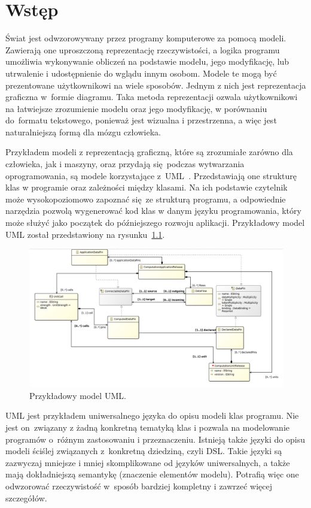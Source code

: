 \chapter{Wstęp}

Świat jest odwzorowywany przez programy komputerowe za pomocą modeli.
Zawierają one uproszczoną reprezentację rzeczywistości, a logika programu
umożliwia wykonywanie obliczeń na podstawie modelu, jego modyfikację, lub
utrwalenie i udostępnienie do wglądu innym osobom.
Modele te mogą być prezentowane użytkownikowi na wiele sposobów. Jednym z nich
jest reprezentacja graficzna w~formie diagramu. Taka metoda reprezentacji
ozwala użytkownikowi na łatwiejsze zrozumienie modelu
oraz jego modyfikację, w porównaniu do~formatu tekstowego, ponieważ jest
wizualna i przestrzenna, a więc jest naturalniejszą formą dla mózgu człowieka.

Przykładem modeli z reprezentacją graficzną, które są zrozumiałe zarówno dla
człowieka, jak i maszyny, oraz
przydają się podczas wytwarzania oprogramowania, są modele korzystające
z~\gls{UML}~\cite{wikipedia-uml}. Przedstawiają
one strukturę klas w programie oraz zależności między klasami. Na ich podstawie
czytelnik może wysokopoziomowo zapoznać się~ze strukturą programu, a
odpowiednie narzędzia pozwolą wygenerować kod klas w danym języku
programowania, który może służyć jako początek do późniejszego rozwoju
aplikacji. Przykładowy model \gls{UML} został przedstawiony na
rysunku~\ref{rys:przykladowy-model-uml}.

\begin{figure}[!hb]
	\centering
	\includegraphics[width=0.95\linewidth]{./images/example-uml-model.png}
	\caption{Przykładowy model \gls{UML}.}\label{rys:przykladowy-model-uml}
\end{figure}

\gls{UML} jest przykładem uniwersalnego języka do opisu modeli klas programu.
Nie jest on~związany z żadną konkretną tematyką klas i pozwala na modelowanie
programów o~różnym zastosowaniu i przeznaczeniu. Istnieją także języki do opisu
modeli ściślej związanych z~konkretną dziedziną, czyli \gls{DSL}. Takie języki
są zazwyczaj mniejsze i mniej skomplikowane od języków uniwersalnych, a także
mają dokładniejszą semantykę (znaczenie elementów modelu). Potrafią więc one
odwzorować rzeczywistość w~sposób bardziej kompletny i zawrzeć więcej
szczegółów.

